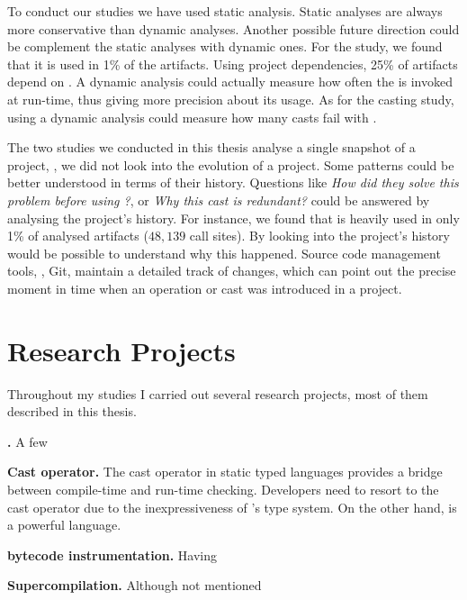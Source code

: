 To conduct our studies we have used static analysis.
Static analyses are always more conservative than dynamic analyses.
Another possible future direction could be complement the static analyses with dynamic ones.
For the \unsafe{} study,
we found that it is used in 1\% of the \mavencentral{} artifacts.
Using project dependencies, 25\% of artifacts depend on \smu{}.
A dynamic analysis could actually measure how often the \unsafe{} \api{} is invoked at run-time,
thus giving more precision about its usage.
As for the casting study,
using a dynamic analysis could measure how many casts fail with .

The two studies we conducted in this thesis analyse a single snapshot of a project,
\ie{}, we did not look into the evolution of a project.
Some patterns could be better understood in terms of their history.
Questions like
\emph{How did they solve this problem before using \unsafe{}?},
or \emph{Why this cast is redundant?}
could be answered by analysing the project's history. 
For instance,
we found that \smu{} is heavily used in only 1\% of analysed artifacts
($48,139$ call sites).
By looking into the project's history would be possible to understand why this happened.
Source code management tools, \eg{}, Git,
maintain a detailed track of changes,
which can point out the precise moment in time when an \unsafe{} operation or cast was introduced in a project.

\section{Research Projects}

Throughout my \phd{} studies I carried out several research projects,
most of them described in this thesis.

\textbf{\unsafe{} \api{}.}
A few 

\textbf{Cast operator.}
The cast operator in static typed languages provides a bridge between compile-time and run-time checking.
Developers need to resort to the cast operator due to the inexpressiveness of \java{}'s type system. 
On the other hand, \ql{} is a powerful language.

\textbf{\java{} bytecode instrumentation.}
Having 

\textbf{Supercompilation.}
Although not mentioned 

